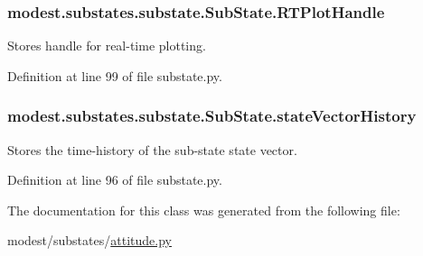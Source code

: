 \subsubsection[{\texorpdfstring{R\+T\+Plot\+Handle}{RTPlotHandle}}]{\setlength{\rightskip}{0pt plus 5cm}modest.\+substates.\+substate.\+Sub\+State.\+R\+T\+Plot\+Handle\hspace{0.3cm}{\ttfamily [inherited]}}\hypertarget{classmodest_1_1substates_1_1substate_1_1SubState_a37ded775b84cea85b4dce0f1b16286c4}{}\label{classmodest_1_1substates_1_1substate_1_1SubState_a37ded775b84cea85b4dce0f1b16286c4}


Stores handle for real-\/time plotting. 



Definition at line 99 of file substate.\+py.

\subsubsection[{\texorpdfstring{state\+Vector\+History}{stateVectorHistory}}]{\setlength{\rightskip}{0pt plus 5cm}modest.\+substates.\+substate.\+Sub\+State.\+state\+Vector\+History\hspace{0.3cm}{\ttfamily [inherited]}}\hypertarget{classmodest_1_1substates_1_1substate_1_1SubState_a38c12c9d0899bc1161f3502b584517a2}{}\label{classmodest_1_1substates_1_1substate_1_1SubState_a38c12c9d0899bc1161f3502b584517a2}


Stores the time-\/history of the sub-\/state state vector. 



Definition at line 96 of file substate.\+py.



The documentation for this class was generated from the following file\+:\begin{DoxyCompactItemize}
\item 
modest/substates/\hyperlink{attitude_8py}{attitude.\+py}\end{DoxyCompactItemize}
